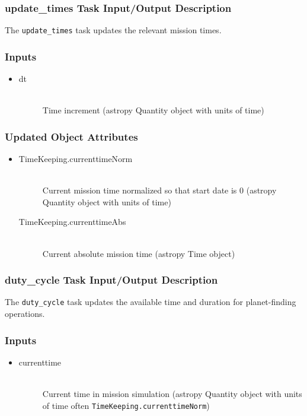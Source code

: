 \documentclass[cleanfoot]{asme2ej}
\begin{document}
\subsubsection{update\_times Task Input/Output Description} \label{sec:updatetimestask}
The \verb+update_times+ task updates the relevant mission times.

\subsubsection*{Inputs}
\begin{itemize}
    \item 
    \begin{description}
        \item[dt] \hfill \\
        Time increment (astropy Quantity object with units of time)
    \end{description}
\end{itemize}

\subsubsection*{Updated Object Attributes}
\begin{itemize}
    \item 
    \begin{description}
        \item[TimeKeeping.currenttimeNorm] \hfill \\
        Current mission time normalized so that start date is 0 (astropy Quantity object with units of time)
        \item[TimeKeeping.currenttimeAbs] \hfill \\
        Current absolute mission time (astropy Time object)
    \end{description}
\end{itemize}

\subsubsection{duty\_cycle Task Input/Output Description} \label{sec:dutycycletask}
The \verb+duty_cycle+ task updates the available time and duration for planet-finding operations.

\subsubsection*{Inputs}
\begin{itemize}
    \item 
    \begin{description}
        \item[currenttime] \hfill \\
        Current time in mission simulation (astropy Quantity object with units of time often \verb+TimeKeeping.currenttimeNorm+)
    \end{description}
\end{itemize}
\end{document}
